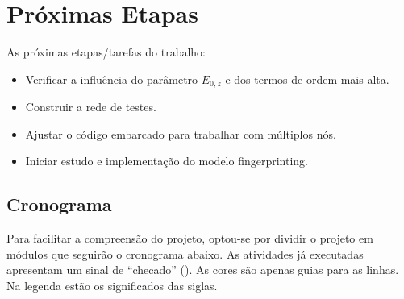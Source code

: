\section{Próximas Etapas}\label{next}
As próximas etapas/tarefas do trabalho:
\begin{itemize}

\item Verificar a influência do parâmetro $E_{0,z}$ e dos termos de ordem mais alta.
\item Construir a rede de testes.
\item Ajustar o código embarcado para trabalhar com múltiplos nós.
\item Iniciar estudo e implementação do modelo fingerprinting.

\end{itemize}

\subsection{Cronograma} \label{sec:crono}
Para facilitar a compreensão do projeto, optou-se por dividir o projeto em módulos que seguirão o cronograma abaixo. As atividades já executadas apresentam um sinal de ``checado'' (\checkmark). As cores são apenas guias para as linhas. Na legenda estão os significados das siglas.

\newcommand{\azul}{\cellcolor[rgb]{0,.5,.8}}
\newcommand{\verde}{\cellcolor[rgb]{.2,.8,.5}}
\newcommand{\verdeu}{\cellcolor[rgb]{0,.8,.3}}
\newcommand{\verded}{\cellcolor[rgb]{0,.8,.1}}
\newcommand{\marro}{\cellcolor[rgb]{.8,.5,.2}}
\newcommand{\cinza}{\cellcolor[rgb]{.8,.8,.8}}
\newcommand{\vermel}{\cellcolor[rgb]{.5,0,.2}}
\newcommand{\overde}{\cellcolor[rgb]{.4,.8,.5}}

